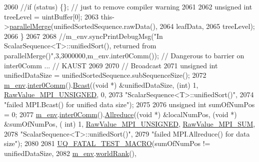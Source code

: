 \begin{DoxyCode}
2060   \textcolor{comment}{//if (status) \{\}; // just to remove compiler warning}
2061 
2062         \textcolor{keywordtype}{unsigned} \textcolor{keywordtype}{int} treeLevel = uintBuffer[0];
2063         this->\hyperlink{class_q_u_e_s_o_1_1_scalar_sequence_aedb57153660cf539fc0ca3737a1c4f7b}{parallelMerge}(unifiedSortedSequence.rawData(),
2064                             leafData,
2065                             treeLevel);
2066       \}
2067 
2068       \textcolor{comment}{//m\_env.syncPrintDebugMsg("In ScalarSequence<T>::unifiedSort(), returned from
       parallelMerge()",3,3000000,m\_env.inter0Comm()); // Dangerous to barrier on inter0Comm ... // KAUST}
2069 
2070       \textcolor{comment}{// Broadcast}
2071       \textcolor{keywordtype}{unsigned} \textcolor{keywordtype}{int} unifiedDataSize = unifiedSortedSequence.subSequenceSize();
2072       \hyperlink{class_q_u_e_s_o_1_1_scalar_sequence_a71618cd6351b29361b437af68447a4c8}{m\_env}.\hyperlink{class_q_u_e_s_o_1_1_base_environment_a689e4d140c74d495d97eb498714a4b82}{inter0Comm}().\hyperlink{class_q_u_e_s_o_1_1_mpi_comm_abd6af8db8b0c7fd2f5b62e26477a9537}{Bcast}((\textcolor{keywordtype}{void} *) &unifiedDataSize, (\textcolor{keywordtype}{int}) 1, 
      \hyperlink{_mpi_comm_8h_a06cbfbc33436f6e0dc8a48ff3c49bdfc}{RawValue\_MPI\_UNSIGNED}, 0,
2073                                \textcolor{stringliteral}{"ScalarSequence<T>::unifiedSort()"},
2074                                \textcolor{stringliteral}{"failed MPI.Bcast() for unified data size"});
2075 
2076       \textcolor{keywordtype}{unsigned} \textcolor{keywordtype}{int} sumOfNumPos = 0;
2077       \hyperlink{class_q_u_e_s_o_1_1_scalar_sequence_a71618cd6351b29361b437af68447a4c8}{m\_env}.\hyperlink{class_q_u_e_s_o_1_1_base_environment_a689e4d140c74d495d97eb498714a4b82}{inter0Comm}().\hyperlink{class_q_u_e_s_o_1_1_mpi_comm_a72e137e60ef8060efb1ee5fc874fa4b8}{Allreduce}((\textcolor{keywordtype}{void} *) &localNumPos, (\textcolor{keywordtype}{void} *) &sumOfNumPos, (\textcolor{keywordtype}{
      int}) 1, \hyperlink{_mpi_comm_8h_a06cbfbc33436f6e0dc8a48ff3c49bdfc}{RawValue\_MPI\_UNSIGNED}, \hyperlink{_mpi_comm_8h_afbf78d291c032aa7f512bc566cee2bd1}{RawValue\_MPI\_SUM},
2078                                    \textcolor{stringliteral}{"ScalarSequence<T>::unifiedSort()"},
2079                                    \textcolor{stringliteral}{"failed MPI.Allreduce() for data size"});
2080 
2081       \hyperlink{_defines_8h_a56d63d18d0a6d45757de47fcc06f574d}{UQ\_FATAL\_TEST\_MACRO}(sumOfNumPos != unifiedDataSize,
2082                           \hyperlink{class_q_u_e_s_o_1_1_scalar_sequence_a71618cd6351b29361b437af68447a4c8}{m\_env}.\hyperlink{class_q_u_e_s_o_1_1_base_environment_a78b57112bbd0e6dd0e8afec00b40ffa7}{worldRank}(),

\end{DoxyCode}
